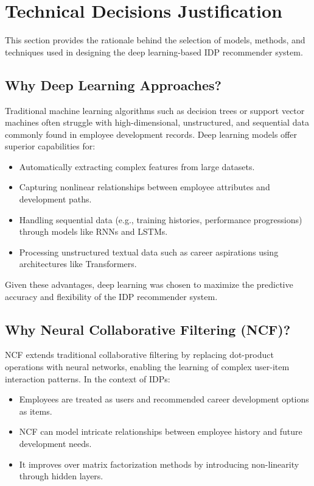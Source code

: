 \section{Technical Decisions Justification}
\label{section:technical_decisions}

This section provides the rationale behind the selection of models, methods, and techniques used in designing the deep learning-based IDP recommender system.

\subsection{Why Deep Learning Approaches?}
Traditional machine learning algorithms such as decision trees or support vector machines often struggle with high-dimensional, unstructured, and sequential data commonly found in employee development records. Deep learning models offer superior capabilities for:
\begin{itemize}
    \item Automatically extracting complex features from large datasets.
    \item Capturing nonlinear relationships between employee attributes and development paths.
    \item Handling sequential data (e.g., training histories, performance progressions) through models like RNNs and LSTMs.
    \item Processing unstructured textual data such as career aspirations using architectures like Transformers.
\end{itemize}
Given these advantages, deep learning was chosen to maximize the predictive accuracy and flexibility of the IDP recommender system.

\subsection{Why Neural Collaborative Filtering (NCF)?}
NCF extends traditional collaborative filtering by replacing dot-product operations with neural networks, enabling the learning of complex user-item interaction patterns. In the context of IDPs:
\begin{itemize}
    \item Employees are treated as users and recommended career development options as items.
    \item NCF can model intricate relationships between employee history and future development needs.
    \item It improves over matrix factorization methods by introducing non-linearity through hidden layers.
\end{itemize}

